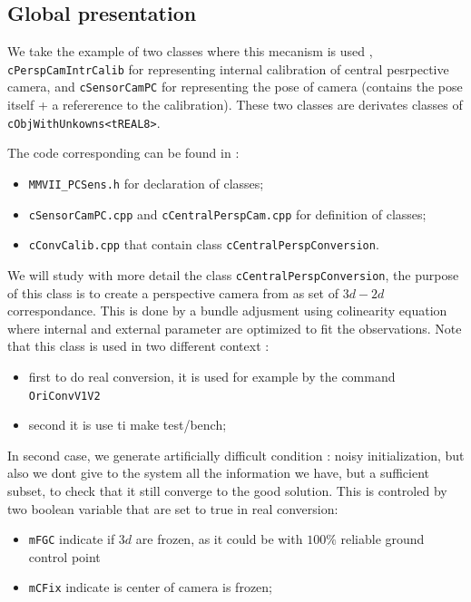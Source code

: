 \subsection{Global presentation}

We take the example of two classes where this mecanism is used ,
{\tt cPerspCamIntrCalib} for representing internal calibration of central pesrpective
camera, and {\tt cSensorCamPC}  for representing the pose of camera (contains
the pose itself + a refererence to the calibration).
These two classes are derivates classes of {\tt cObjWithUnkowns<tREAL8>}.

The code corresponding can be found in :

\begin{itemize}
   \item {\tt MMVII\_PCSens.h} for declaration of classes;

   \item {\tt cSensorCamPC.cpp}  and {\tt cCentralPerspCam.cpp} for definition of classes;

   \item {\tt cConvCalib.cpp}  that contain  class {\tt cCentralPerspConversion}.
\end{itemize}


We will study with more detail the class {\tt cCentralPerspConversion}, the purpose
of this class is to create a perspective camera from  as set of $3d-2d$ correspondance.
This is done by a bundle adjusment using colinearity equation where internal and
external parameter are optimized to fit the observations.
Note that this class is used in two different context :

\begin{itemize}
   \item first to do real conversion,  it is used for example by the command {\tt OriConvV1V2}
   \item second  it is use ti make test/bench; 
\end{itemize}

In second case, we generate artificially difficult condition : noisy initialization, but
also we dont give to the system all the information we have, but a sufficient subset, to
check that it still converge to the good solution. This is controled by two boolean
variable that are set to true in real conversion: 

\begin{itemize}
   \item {\tt  mFGC}   indicate if $3d$ are frozen, as it could be with $100\%$ reliable ground control point
                       
   \item {\tt mCFix} indicate is center of camera is frozen;
\end{itemize}


